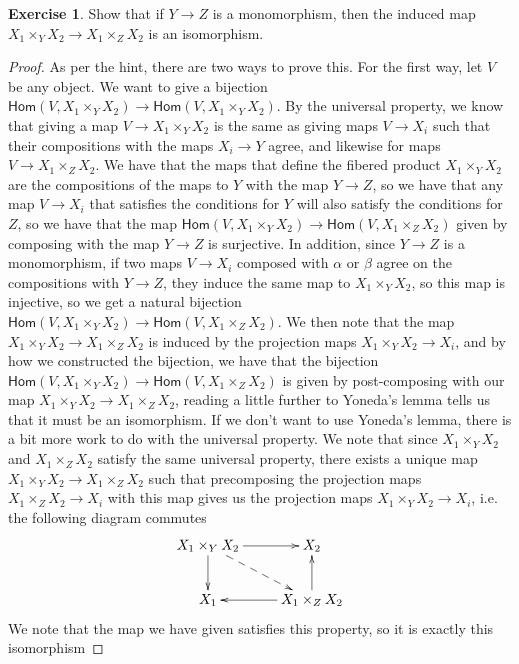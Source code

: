 \documentclass[psamsfonts]{amsart}
\theoremstyle{definition}
\newtheorem{exer}[thm]{Exercise}
\theoremstyle{remark}
\renewcommand{\hom}{\mathsf{Hom}}
\begin{document}
%
\begin{exer}
Show that if $Y \to Z$ is a monomorphism, then the induced map $X_1 \times_Y X_2 \to X_1 \times_Z X_2$ is an isomorphism.
\end{exer}
%
\begin{proof}
As per the hint, there are two ways to prove this. For the first way, let $V$ be any object. We want to give a bijection $\hom(V,X_1 \times_Y X_2) \to \hom(V, X_1 \times_Y X_2)$. By the universal property, we know that giving a map $V \to X_1 \times_Y X_2$ is the same as giving maps $V \to X_i$ such that their compositions with the maps $X_i \to Y$ agree, and likewise for maps $V \to X_1 \times_Z X_2$. We have that the maps that define the fibered product  $X_1 \times_Y X_2$ are the compositions of the maps to $Y$ with the map $Y \to Z$, so we have that any map $V \to X_i$ that satisfies the conditions for $Y$ will also satisfy the conditions for $Z$,  so we have that the map $\hom(V, X_1 \times_Y X_2) \to \hom(V, X_1 \times_Z X_2)$ given by composing with the map $Y \to Z$ is surjective. In addition, since $Y \to Z$ is a monomorphism, if two maps $V \to X_i$ composed with  $\alpha$ or $\beta$ agree on the compositions with $Y \to Z$, they induce the same map to $X_1 \times_Y X_2$, so this map is injective, so we get a natural bijection $\hom(V, X_1 \times_Y X_2) \to \hom(V, X_1 \times_Z X_2)$. We then note that the map $X_1 \times_Y X_2 \to X_1 \times_Z X_2$ is induced by the projection maps $X_1 \times_Y X_2 \to X_i$, and by how we constructed the bijection, we have that the bijection $\hom(V, X_1 \times_Y X_2) \to \hom(V,X_1 \times_Z X_2)$ is given by post-composing with our map $X_1 \times_Y X_2 \to X_1 \times_Z X_2$, reading a little further to Yoneda's lemma tells us that it must be an isomorphism. If we don't want to use Yoneda's lemma, there is a bit more work to do with the universal property. We note that since $X_1 \times_Y X_2$ and $X_1 \times_Z X_2$ satisfy the same universal property, there exists a unique map $X_1 \times_Y X_2 \to X_1 \times_Z X_2$ such that precomposing the projection maps $X_1 \times_Z X_2 \to X_i$ with this map gives us the projection maps $X_1\times_Y X_2 \to X_i$, i.e. the following diagram commutes
$$\xymatrix{
X_1 \times_Y X_2  \ar@{-->}[dr] \ar[d] \ar[r] & X_2 \\
X_1 & X_1\times_Z X_2 \ar[u] \ar[l]
}$$
We note that the map we have given satisfies this property, so it is exactly this isomorphism
\iffalse
Alternatively, we can use the magic diagram, which tells us that the following diagram commutes
$$\xymatrix{
X_1 \times_Y X_2  \ar[d]_\gamma \ar[r]^{\varphi}  & X_1 \times_Z X_2 \ar[d]^\delta \\
Y \ar[r]_\psi & Y \times_Z Y
}$$
From a previous exercise, since $Y \to Z$ is a monomorphism, the bottom map is an isomorphism. We claim that this implies that the top map is an isomorphism. To show this, we use a similar strategy of showing that $X_1 \times_Z X_2$ satisfies the same universal property as $X_1 \times_Y X_2$. Since $\psi$ is an isomorphism,
\fi

\end{proof}
\end{document}
